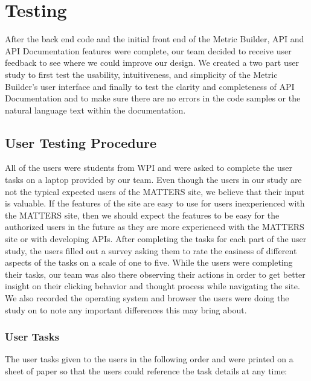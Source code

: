 \chapter{Testing}

	After the back end code and the initial front end of the Metric Builder, 
	API and API Documentation features were complete, our team decided to receive 
	user feedback to see where we could improve our design. We created a two part 
	user study to first test the usability, intuitiveness, and simplicity of the 
	Metric Builder's user interface and finally to test the clarity and completeness 
	of API Documentation and to make sure there are no errors in the code samples 
	or the natural language text within the documentation. 

	\section{User Testing Procedure}

		All of the users were students from WPI and were asked to complete the user tasks on a 
		laptop provided by our team. Even though the users in our study are not the typical 
		expected users of the MATTERS site, we believe that their input is valuable. 
		If the features of the site are easy to use for users inexperienced with the MATTERS site, 
		then we should expect the features to be easy for the authorized users in the future as they 
		are more experienced with the MATTERS site or with developing APIs. After completing the tasks 
		for each part of the user study, the users filled out a survey asking them to rate the 
		easiness of different aspects of the tasks on a scale of one to five. While the users were 
		completing their tasks, our team was also there observing their actions in order to get better 
		insight on their clicking behavior and thought process while navigating the site. 
		We also recorded the operating system and browser the users were doing the study on to 
		note any important differences this may bring about.

		\subsection{User Tasks} 
		
			The user tasks given to the users in the following order and were printed on a 
			sheet of paper so that the users could reference the task details at any time:
			
